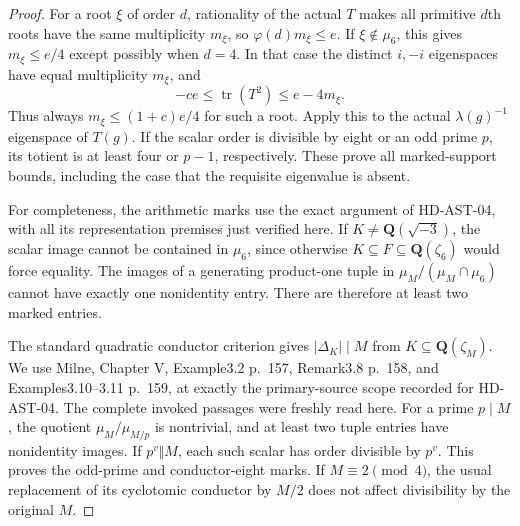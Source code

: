 \begin{proof}
For a root $\xi$ of order $d$, rationality of the actual
$T$ makes all primitive $d$th roots have the same multiplicity
$m_\xi$, so $\varphi(d)m_\xi\le e$. If $\xi\notin\mu_6$,
this gives $m_\xi\le e/4$ except possibly when $d=4$.
In that case the distinct $i,-i$ eigenspaces have equal
multiplicity $m_\xi$, and
\[
                 -ce\le\operatorname{tr}(T^2)
                                    \le e-4m_\xi.           \tag{ATT.8}
\]
Thus always $m_\xi\le(1+c)e/4$ for such a root. Apply this
to the actual $\lambda(g)^{-1}$ eigenspace of $T(g)$.
If the scalar order is divisible by eight or an odd prime
$p$, its totient is at least four or $p-1$, respectively.
These prove all marked-support bounds, including the case
that the requisite eigenvalue is absent.

For completeness, the arithmetic marks use the exact
argument of HD-AST-04, with all its representation premises
just verified here. If $K\ne\mathbf Q(\sqrt{-3})$, the
scalar image cannot be contained in $\mu_6$, since otherwise
$K\subseteq F\subseteq\mathbf Q(\zeta_6)$ would force equality.
The images of a generating product-one tuple in
$\mu_M/(\mu_M\cap\mu_6)$ cannot have exactly one nonidentity
entry. There are therefore at least two marked entries.

The standard quadratic conductor criterion gives
$|\Delta_K|\mid M$ from $K\subseteq\mathbf Q(\zeta_M)$.
We use Milne, Chapter V, Example3.2 p.~157, Remark3.8 p.~158,
and Examples3.10--3.11 p.~159, at exactly the primary-source
scope recorded for HD-AST-04.\cite{HD:MilneCFT2020}
The complete invoked passages were freshly read here.
For a prime $p\mid M$, the quotient
$\mu_M/\mu_{M/p}$ is nontrivial, and at least two tuple
entries have nonidentity images. If $p^v\Vert M$, each
such scalar has order divisible by $p^v$. This proves the
odd-prime and conductor-eight marks. If $M\equiv2\pmod4$,
the usual replacement of its cyclotomic conductor by $M/2$
does not affect divisibility by the original $M$.
\end{proof}

